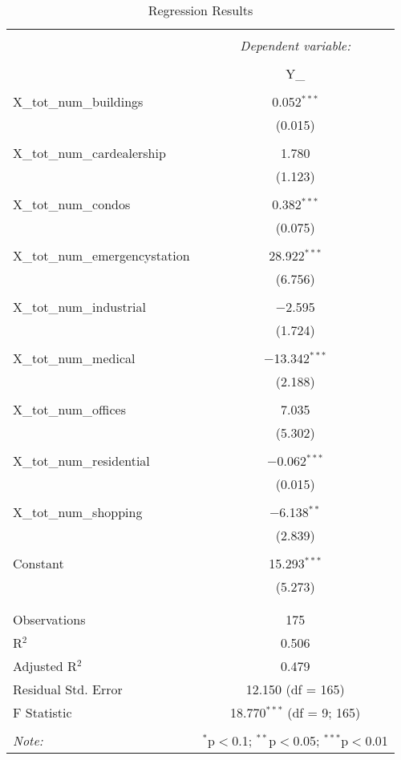 
\begin{table}[!htbp] \centering 
  \caption{Regression Results} 
  \label{} 
\begin{tabular}{@{\extracolsep{5pt}}lc} 
\\[-1.8ex]\hline 
\hline \\[-1.8ex] 
 & \multicolumn{1}{c}{\textit{Dependent variable:}} \\ 
\cline{2-2} 
\\[-1.8ex] & Y\_ \\ 
\hline \\[-1.8ex] 
 X\_tot\_num\_buildings & 0.052$^{***}$ \\ 
  & (0.015) \\ 
  & \\ 
 X\_tot\_num\_cardealership & 1.780 \\ 
  & (1.123) \\ 
  & \\ 
 X\_tot\_num\_condos & 0.382$^{***}$ \\ 
  & (0.075) \\ 
  & \\ 
 X\_tot\_num\_emergencystation & 28.922$^{***}$ \\ 
  & (6.756) \\ 
  & \\ 
 X\_tot\_num\_industrial & $-$2.595 \\ 
  & (1.724) \\ 
  & \\ 
 X\_tot\_num\_medical & $-$13.342$^{***}$ \\ 
  & (2.188) \\ 
  & \\ 
 X\_tot\_num\_offices & 7.035 \\ 
  & (5.302) \\ 
  & \\ 
 X\_tot\_num\_residential & $-$0.062$^{***}$ \\ 
  & (0.015) \\ 
  & \\ 
 X\_tot\_num\_shopping & $-$6.138$^{**}$ \\ 
  & (2.839) \\ 
  & \\ 
 Constant & 15.293$^{***}$ \\ 
  & (5.273) \\ 
  & \\ 
\hline \\[-1.8ex] 
Observations & 175 \\ 
R$^{2}$ & 0.506 \\ 
Adjusted R$^{2}$ & 0.479 \\ 
Residual Std. Error & 12.150 (df = 165) \\ 
F Statistic & 18.770$^{***}$ (df = 9; 165) \\ 
\hline 
\hline \\[-1.8ex] 
\textit{Note:}  & \multicolumn{1}{r}{$^{*}$p$<$0.1; $^{**}$p$<$0.05; $^{***}$p$<$0.01} \\ 
\end{tabular} 
\end{table} 
